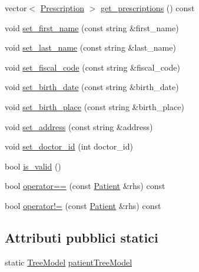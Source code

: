 \begin{DoxyCompactItemize}
\item 
vector$<$ \mbox{\hyperlink{classmm_1_1model_1_1_prescription}{Prescription}} $>$ \mbox{\hyperlink{classmm_1_1model_1_1_patient_ac13776eadc56f98bf353dd412f9c2f51}{get\+\_\+prescriptions}} () const
\item 
void \mbox{\hyperlink{classmm_1_1model_1_1_patient_a8b8dd8c6de5963a717cf192ca10c605e}{set\+\_\+first\+\_\+name}} (const string \&first\+\_\+name)
\item 
void \mbox{\hyperlink{classmm_1_1model_1_1_patient_a4883fc926a6693a2a6fd2b50ab2ded0e}{set\+\_\+last\+\_\+name}} (const string \&last\+\_\+name)
\item 
void \mbox{\hyperlink{classmm_1_1model_1_1_patient_a45485e586eb4a908ed4c7a51059fc131}{set\+\_\+fiscal\+\_\+code}} (const string \&fiscal\+\_\+code)
\item 
void \mbox{\hyperlink{classmm_1_1model_1_1_patient_ad73008977024e6ca48e5c687eb27b996}{set\+\_\+birth\+\_\+date}} (const string \&birth\+\_\+date)
\item 
void \mbox{\hyperlink{classmm_1_1model_1_1_patient_a6dc732f738425cc729764fdf16d667f0}{set\+\_\+birth\+\_\+place}} (const string \&birth\+\_\+place)
\item 
void \mbox{\hyperlink{classmm_1_1model_1_1_patient_a4e19f86233b55b4dec59f947f1dfe32a}{set\+\_\+address}} (const string \&address)
\item 
void \mbox{\hyperlink{classmm_1_1model_1_1_patient_a9dda6ce10296ab196cd5681b8e9a1091}{set\+\_\+doctor\+\_\+id}} (int doctor\+\_\+id)
\item 
bool \mbox{\hyperlink{classmm_1_1model_1_1_patient_a5f9da3f880ef1adc4bc5443ea407f48f}{is\+\_\+valid}} ()
\item 
bool \mbox{\hyperlink{classmm_1_1model_1_1_patient_a69367747ebc66b1b4e2fdf961811d83d}{operator==}} (const \mbox{\hyperlink{classmm_1_1model_1_1_patient}{Patient}} \&rhs) const
\item 
bool \mbox{\hyperlink{classmm_1_1model_1_1_patient_a96fe68d415c82b084ca75e87aefe8314}{operator!=}} (const \mbox{\hyperlink{classmm_1_1model_1_1_patient}{Patient}} \&rhs) const
\end{DoxyCompactItemize}
\subsection*{Attributi pubblici statici}
\begin{DoxyCompactItemize}
\item 
static \mbox{\hyperlink{structmm_1_1model_1_1_patient_1_1_tree_model}{Tree\+Model}} \mbox{\hyperlink{classmm_1_1model_1_1_patient_af2fe625b7bf2e3308df51daaff966281}{patient\+Tree\+Model}}
\end{DoxyCompactItemize}


